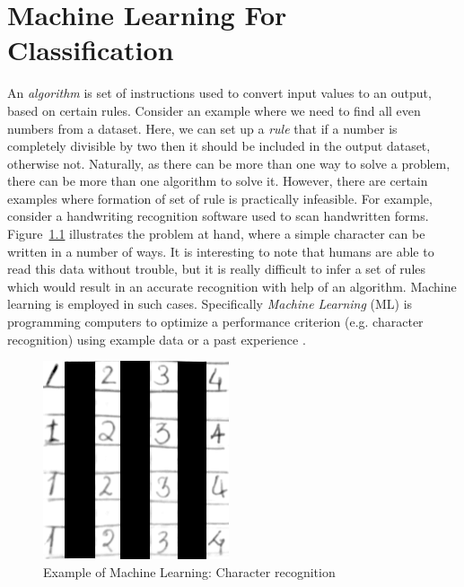 \chapter{Machine Learning For Classification}
\label{chap:chapter3}
An \emph{algorithm} is set of instructions used to convert input values to an output, based on certain rules. Consider an example where we need to find all even numbers from a dataset. Here, we can set up a \emph{rule} that if a number is completely divisible by two then it should be included in the output dataset, otherwise not. Naturally, as there can be more than one way to solve a problem, there can be more than one algorithm to solve it. However, there are certain examples where formation of set of rule is practically infeasible. For example, consider a handwriting recognition software used to scan handwritten forms. Figure~\ref{fig:charrec} illustrates the problem at hand, where a simple character can be written in a number of ways. It is interesting to note that humans are able to read this data without trouble, but it is really difficult to infer a set of rules which would result in an accurate recognition with help of an algorithm. Machine learning is employed in such cases. Specifically \emph{Machine Learning} (ML) is programming computers to optimize a performance criterion (e.g. character recognition) using example data or a past experience \cite{Alpaydin2004}. 

\begin{figure}[h]
  \begin{center}
    \captionsetup{justification=centering}
    \includegraphics[scale=0.5]{figures/charrec.png}
    \caption{Example of Machine Learning: Character recognition}
    \label{fig:charrec}
  \end{center}
\end{figure}

